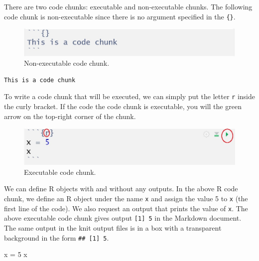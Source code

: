 \documentclass[
]{book}
\newenvironment{Shaded}{\begin{snugshade}}{\end{snugshade}}
\newcommand{\DecValTok}[1]{\textcolor[rgb]{0.00,0.00,0.81}{#1}}
\newcommand{\NormalTok}[1]{#1}
\newcommand{\OtherTok}[1]{\textcolor[rgb]{0.56,0.35,0.01}{#1}}
\begin{document}
There are two code chunks: executable and non-executable chunks. The following code chunk is non-executable since there is no argument specified in the \texttt{\{\}}.

\begin{figure}

{\centering \includegraphics[width=0.8\linewidth]{img01/Non-executable-code-chunk} 

}

\caption{Non-executable code chunk.}\label{fig:unnamed-chunk-14}
\end{figure}

\begin{verbatim}
This is a code chunk
\end{verbatim}

To write a code chunk that will be executed, we can simply put the letter \texttt{r} inside the curly bracket. If the code the code chunk is executable, you will the green arrow on the top-right corner of the chunk.

\begin{figure}

{\centering \includegraphics[width=0.8\linewidth]{img01/Executable-code-chunk} 

}

\caption{Executable code chunk.}\label{fig:unnamed-chunk-15}
\end{figure}

We can define R objects with and without any outputs. In the above R code chunk, we define an R object under the name \texttt{x} and assign the value 5 to \texttt{x} (the first line of the code). We also request an output that prints the value of \texttt{x}. The above executable code chunk gives output \texttt{{[}1{]}\ 5} in the Markdown document. The same output in the knit output files is in a box with a transparent background in the form \texttt{\#\#\ {[}1{]}\ 5}.

\begin{Shaded}
\begin{Highlighting}[]
\NormalTok{x }\OtherTok{=} \DecValTok{5}
\NormalTok{x}
\end{Highlighting}
\end{Shaded}
\end{document}
